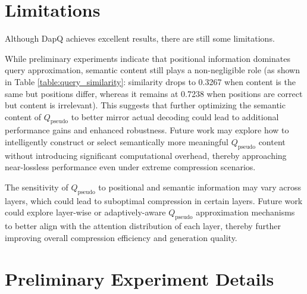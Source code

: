 \documentclass[11pt]{article}
\begin{document}
\section*{Limitations}
Although DapQ achieves excellent results, there are still some limitations.

While preliminary experiments indicate that positional information dominates query approximation, semantic content still plays a non-negligible role (as shown in Table \ref{table:query_similarity}: similarity drops to 0.3267 when content is the same but positions differ, whereas it remains at 0.7238 when positions are correct but content is irrelevant). This suggests that further optimizing the semantic content of \texorpdfstring{\(Q_{\text{pseudo}}\)}{Q\_pseudo} to better mirror actual decoding could lead to additional performance gains and enhanced robustness. Future work may explore how to intelligently construct or select semantically more meaningful \texorpdfstring{\(Q_{\text{pseudo}}\)}{Q\_pseudo} content without introducing significant computational overhead, thereby approaching near-lossless performance even under extreme compression scenarios.

The sensitivity of \texorpdfstring{\(Q_{\text{pseudo}}\)}{Q\_pseudo} to positional and semantic information may vary across layers, which could lead to suboptimal compression in certain layers. Future work could explore layer-wise or adaptively-aware \texorpdfstring{\(Q_{\text{pseudo}}\)}{Q\_pseudo} approximation mechanisms to better align with the attention distribution of each layer, thereby further improving overall compression efficiency and generation quality.






\clearpage
\appendix
\section{Preliminary Experiment Details}
\label{Preliminary Experiment Details}
\end{document}
